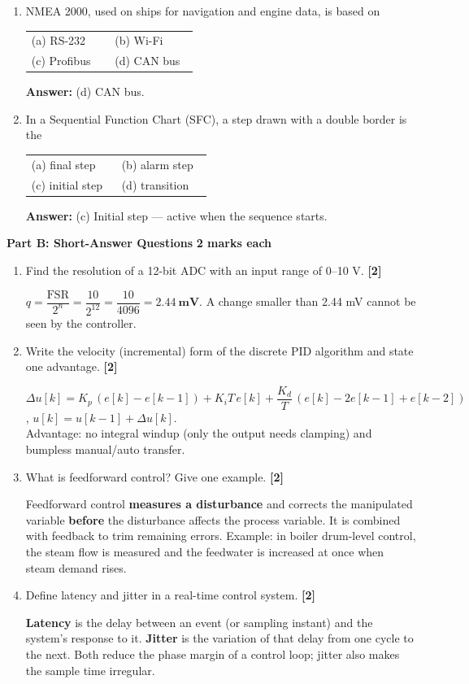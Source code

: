 \documentclass[11pt,a4paper]{article}
\makeatletter
\newcommand{\opts}[4]{%
	\par\smallskip
	\begin{tabular}{@{}p{0.46\linewidth}p{0.46\linewidth}@{}}
		(a) #1 & (b) #2 \\
		(c) #3 & (d) #4 \\
	\end{tabular}\par}
\newcommand{\ans}[1]{%
	\par\smallskip
	{\color{cGreen!50!black}\textbf{Answer:} #1}\par\medskip}
\newcommand{\qmarks}[1]{\hfill\textbf{[#1]}}
\newcommand{\partheading}[2]{%
	\bigskip
	\begin{tcolorbox}[colback=cAccent!10, colframe=cAccent, boxrule=0.6pt, arc=2pt, left=6pt, top=3pt, bottom=3pt]
		\textbf{\large #1} \hfill \textbf{#2}
	\end{tcolorbox}}
\makeatother
\begin{document}
\begin{enumerate}
		\item NMEA 2000, used on ships for navigation and engine data, is based on
		\opts{RS-232}{Wi-Fi}{Profibus}{CAN bus}
		\ans{(d) CAN bus.}

		\item In a Sequential Function Chart (SFC), a step drawn with a double border is the
		\opts{final step}{alarm step}{initial step}{transition}
		\ans{(c) Initial step --- active when the sequence starts.}

	\end{enumerate}

	\partheading{Part B: Short-Answer Questions}{2 marks each}
	\begin{enumerate}

		\item Find the resolution of a 12-bit ADC with an input range of 0--10 V. \qmarks{2}
		\begin{answer}
			$q = \dfrac{\text{FSR}}{2^n} = \dfrac{10}{2^{12}} = \dfrac{10}{4096} = \mathbf{2.44\ mV}$. A change smaller than 2.44 mV cannot be seen by the controller.
		\end{answer}

		\item Write the velocity (incremental) form of the discrete PID algorithm and state one advantage. \qmarks{2}
		\begin{answer}
			$\Delta u[k] = K_p\,(e[k]-e[k-1]) + K_iT\,e[k] + \dfrac{K_d}{T}\,(e[k]-2e[k-1]+e[k-2])$, \quad $u[k] = u[k-1] + \Delta u[k]$.\\
			Advantage: no integral windup (only the output needs clamping) and bumpless manual/auto transfer.
		\end{answer}

		\item What is feedforward control? Give one example. \qmarks{2}
		\begin{answer}
			Feedforward control \textbf{measures a disturbance} and corrects the manipulated variable \textbf{before} the disturbance affects the process variable. It is combined with feedback to trim remaining errors. Example: in boiler drum-level control, the steam flow is measured and the feedwater is increased at once when steam demand rises.
		\end{answer}

		\item Define latency and jitter in a real-time control system. \qmarks{2}
		\begin{answer}
			\textbf{Latency} is the delay between an event (or sampling instant) and the system's response to it. \textbf{Jitter} is the variation of that delay from one cycle to the next. Both reduce the phase margin of a control loop; jitter also makes the sample time irregular.
		\end{answer}


\end{enumerate}
\end{document}
